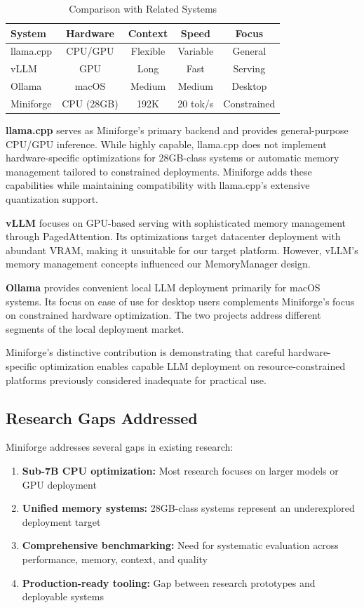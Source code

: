 \begin{table}[h]
\centering
\caption{Comparison with Related Systems}
\label{tab:related_comparison}
\begin{tabular}{lcccc}
\toprule
\textbf{System} & \textbf{Hardware} & \textbf{Context} & \textbf{Speed} & \textbf{Focus} \\
\midrule
llama.cpp & CPU/GPU & Flexible & Variable & General \\
vLLM & GPU & Long & Fast & Serving \\
Ollama & macOS & Medium & Medium & Desktop \\
Miniforge & CPU (28GB) & 192K & 20 tok/s & Constrained \\
\bottomrule
\end{tabular}
\end{table}

\textbf{llama.cpp} serves as Miniforge's primary backend and provides general-purpose CPU/GPU inference. While highly capable, llama.cpp does not implement hardware-specific optimizations for 28GB-class systems or automatic memory management tailored to constrained deployments. Miniforge adds these capabilities while maintaining compatibility with llama.cpp's extensive quantization support.

\textbf{vLLM} focuses on GPU-based serving with sophisticated memory management through PagedAttention. Its optimizations target datacenter deployment with abundant VRAM, making it unsuitable for our target platform. However, vLLM's memory management concepts influenced our MemoryManager design.

\textbf{Ollama} provides convenient local LLM deployment primarily for macOS systems. Its focus on ease of use for desktop users complements Miniforge's focus on constrained hardware optimization. The two projects address different segments of the local deployment market.

Miniforge's distinctive contribution is demonstrating that careful hardware-specific optimization enables capable LLM deployment on resource-constrained platforms previously considered inadequate for practical use.

\subsection{Research Gaps Addressed}

Miniforge addresses several gaps in existing research:

\begin{enumerate}
    \item \textbf{Sub-7B CPU optimization:} Most research focuses on larger models or GPU deployment
    \item \textbf{Unified memory systems:} 28GB-class systems represent an underexplored deployment target
    \item \textbf{Comprehensive benchmarking:} Need for systematic evaluation across performance, memory, context, and quality
    \item \textbf{Production-ready tooling:} Gap between research prototypes and deployable systems
\end{enumerate}

